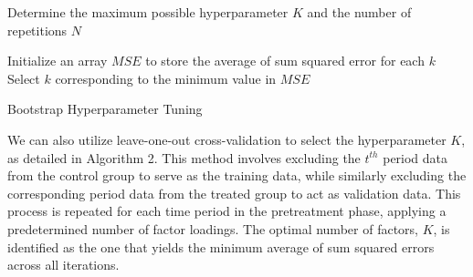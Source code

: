\documentclass[12pt]{article}
\begin{document}
\begin{algorithm}[!ht]
    \SetAlgoLined
    Determine the maximum possible hyperparameter $K$ and the number of repetitions $N$\;

    Initialize an array $MSE$ to store the average of sum squared error for each $k$\;
    Select $k$ corresponding to the minimum value in $MSE$\;
    \caption{Bootstrap Hyperparameter Tuning}
    \label{algorithm: 1}
\end{algorithm}

We can also utilize leave-one-out cross-validation to select the hyperparameter $K$, as detailed in Algorithm 2. This method involves excluding the $t^{th}$ period data from the control group to serve as the training data, while similarly excluding the corresponding period data from the treated group to act as validation data. This process is repeated for each time period in the pretreatment phase, applying a predetermined number of factor loadings. The optimal number of factors, $K$, is identified as the one that yields the minimum average of sum squared errors across all iterations.
\end{document}
